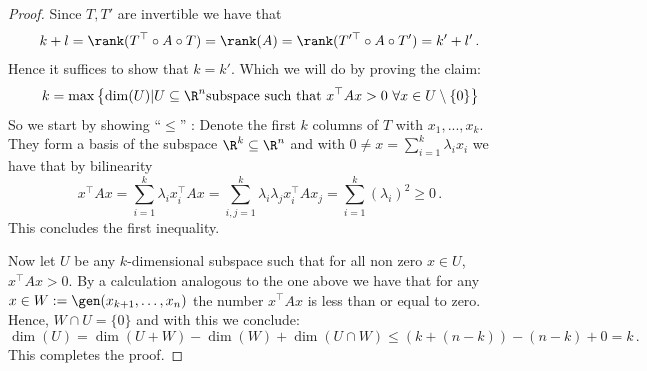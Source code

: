  \begin{proof}
 	Since $T,T'$ are invertible we have that
 	\begin{align}
 		k+l=\rank(T^\top \circ A\circ T)=\rank(A)=\rank(T'^\top \circ A\circ T')=k'+l' \, .
 	\end{align} Hence it suffices to show that $k=k'$. Which we will do by proving the claim:
 	\begin{equation*}
 		k=\max \left\{ \dim(U)|U\subseteq \R^n \text{subspace such that } x^\top Ax>0 ~\forall x\in U\setminus \{0\}  \right\}
 	\end{equation*}
 	So we start by showing \enquote{$\leq$} :
 	Denote the first $k$ columns of $T$ with $x_1,...,x_k$. They form a basis of the subspace $\R^k\subseteq \R^n$ and with $ 0 \neq x=\sum_{i=1}^k\lambda_i x_i$ we have that by bilinearity
 	\begin{equation}
 		x^\top Ax=\sum_{i=1}^{k}\lambda_i x_i^\top A x=\sum_{i,j=1}^{k}\lambda_i \lambda_j x_i^\top A x_j=\sum_{i=1}^{k}(\lambda_i)^2\geq 0 \,. 
 	\end{equation} This concludes the first inequality. 
 	
 	Now let $U$ be any $k$-dimensional subspace such that for all non zero $x\in U$, $x^\top Ax>0$. By a calculation analogous to the one above we have that for any $x\in W:= \gen (x_{k+1},\dots, x_n)$ the number $x^\top Ax$ is less than or equal to zero. Hence, $W\cap U= \{0\}$ and with this we conclude:
 	\begin{equation}
 		\dim(U)=\dim(U+W)-\dim(W)+\dim(U\cap W)\leq (k+(n-k))-(n-k)+0=k\, .
 	\end{equation} This completes the proof.
 \end{proof}
 
